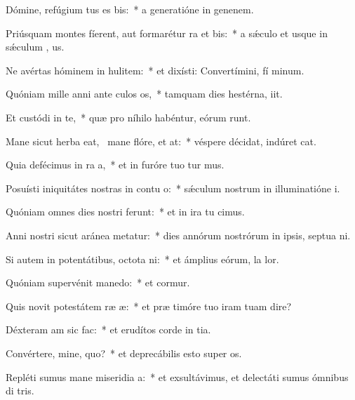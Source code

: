 \item Dómine, refúgium tus es bis:~* a generatióne in genenem.
\item Priúsquam montes fíerent, aut formarétur ra et bis:~* a sǽculo et usque in sǽculum  , us.
\item Ne avértas hóminem in hulitem:~* et dixísti: Convertímini, fí minum.
\item Quóniam mille anni ante culos os,~* tamquam dies hestérna,  iit.
\item Et custódi in te,~* quæ pro níhilo habéntur, eórum  runt.
\item Mane sicut herba eat,~\pscross{} mane flóre, et at:~* véspere décidat, indúret  cat.
\item Quia defécimus in ra a,~* et in furóre tuo tur mus.
\item Posuísti iniquitátes nostras in contu o:~* sǽculum nostrum in illuminatióne  i.
\item Quóniam omnes dies nostri ferunt:~* et in ira tu cimus.
\item Anni nostri sicut aránea metatur:~* dies annórum nostrórum in ipsis, septua ni.
\item Si autem in potentátibus, octota ni:~* et ámplius eórum, la  lor.
\item Quóniam supervénit manedo:~* et cormur.
\item Quis novit potestátem ræ æ:~* et præ timóre tuo iram tuam dire?
\item Déxteram am sic  fac:~* et erudítos corde in tia.
\item Convértere, mine, quo?~* et deprecábilis esto super  os.
\item Repléti sumus mane miseridia a:~* et exsultávimus, et delectáti sumus ómnibus di tris.
